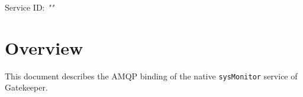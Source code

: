 \documentclass[a4paper]{arrowhead}
\begin{document}
\sloppy

\ArrowheadSetup

\begin{center}
  \vspace*{1cm}
  \huge{\arrowtitle}

  \vspace*{0.2cm}
  \LARGE{\arrowtype}
  \vspace*{1cm}

  \Large{Service ID: \textit{"\arrowid"}}

  \vspace*{\fill}


  \vspace*{1cm}
  \vspace*{\fill}

  \begin{abstract}
    This document describes the AMQP 0-9-1 protocol with TLS payload security and JSON payload encoding variant of the \texttt{sysMonitor} service of the Gatekeeper system (SysMonitor-AMQP-IDD-5.2.2).
  \end{abstract}

  \vspace*{1cm}
\end{center}

\newpage

\tableofcontents
\newpage

\section{Overview}
\label{sec:overview}

This document describes the AMQP binding of the native \texttt{sysMonitor} service of Gatekeeper.
\end{document}
